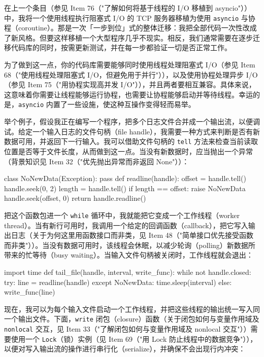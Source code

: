 在上一个条目（参见 Item 76（"了解如何将基于线程的 I/O 移植到 asyncio"））中，我将一个使用线程执行阻塞式 I/O 的 TCP 服务器移植为使用 \texttt{asyncio} 与协程（coroutine）。那是一次「一步到位」式的整体迁移：我把全部代码一次性改成了新风格。但要这样移植一个大型程序几乎不现实。相反，我们通常需要在逐步迁移代码库的同时，按需更新测试，并在每一步都验证一切是否正常工作。

为了做到这一点，你的代码库需要能够同时使用线程处理阻塞式 I/O（参见 Item 68（"使用线程处理阻塞式 I/O，但避免用于并行"）），以及使用协程处理异步 I/O（参见 Item 75（"用协程实现高并发 I/O"）），并且两者要相互兼容。具体来说，这意味着你需要让线程能够运行协程，也需要让协程能够启动并等待线程。幸运的是，\texttt{asyncio} 内置了一些设施，使这种互操作变得轻而易举。

举个例子，假设我正在编写一个程序，把多个日志文件合并成一个输出流，以便调试。给定一个输入日志的文件句柄（file handle），我需要一种方式来判断是否有新数据可用，并返回下一行输入。我可以借助文件句柄的 \texttt{tell} 方法来检查当前读取位置是否等于文件长度，从而做到这一点。当没有新数据时，应当抛出一个异常（背景知识见 Item 32（"优先抛出异常而非返回 None"））：

\begin{codebox}[python]
class NoNewData(Exception):
    pass
def readline(handle):
    offset = handle.tell()
    handle.seek(0, 2)
    length = handle.tell()
    if length == offset:
        raise NoNewData
    handle.seek(offset, 0)
    return handle.readline()
\end{codebox}

把这个函数包进一个 \texttt{while} 循环中，我就能把它变成一个工作线程（worker thread）。当有新行可用时，我调用一个给定的回调函数（callback），把它写入输出日志（关于为何这里用函数接口而非类，见 Item 48（"简单接口优先接受函数而非类"））。当没有数据可用时，该线程会休眠，以减少轮询（polling）新数据所带来的忙等待（busy waiting）。当输入文件句柄被关闭时，工作线程就会退出：

\begin{codebox}[python]
import time
def tail_file(handle, interval, write_func):
    while not handle.closed:
        try:
            line = readline(handle)
        except NoNewData:
            time.sleep(interval)
        else:
            write_func(line)
\end{codebox}

现在，我可以为每个输入文件启动一个工作线程，并把这些线程的输出统一写入同一个输出文件。下面，\texttt{write} 闭包（closure）函数（关于闭包如何与变量作用域及 \texttt{nonlocal} 交互，见 Item 33（"了解闭包如何与变量作用域及 nonlocal 交互"））需要使用一个 \texttt{Lock}（锁）实例（见 Item 69（"用 Lock 防止线程中的数据竞争"）），以便对写入输出流的操作进行串行化（serialize），并确保不会出现行内冲突：

